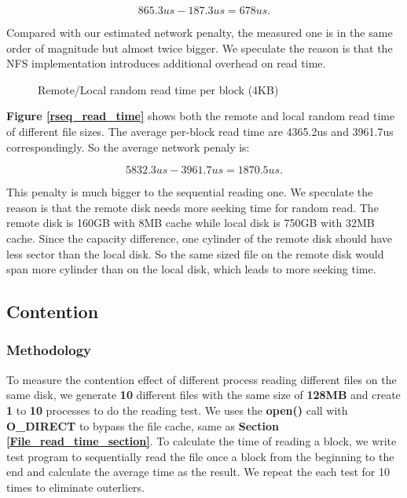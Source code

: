 $$865.3us - 187.3us = 678us.$$

Compared with our estimated network penalty, the measured one is in the same order of magnitude but almost twice bigger. We speculate the reason is that the NFS implementation introduces additional overhead on read time.

\begin{figure}[ht]
    \centering
    \caption{Remote/Local random read time per block (4KB)}
    \label{rrand_read_time}
\end{figure}

\textbf{Figure \ref{rseq_read_time}} shows both the remote and local random read time of different file sizes. The average per-block read time are 4365.2us and 3961.7us correspondingly. So the average network penaly is:

$$5832.3us - 3961.7us = 1870.5us.$$

This penalty is much bigger to the sequential reading one. We speculate the reason is that the remote disk needs more seeking time for random read. The remote disk is 160GB with 8MB cache while local disk is 750GB with 32MB cache. Since the capacity difference, one cylinder of the remote disk should have less sector than the local disk. So the same sized file on the remote disk would span more cylinder than on the local disk, which leads to more seeking time.

\subsection{Contention}
\subsubsection{Methodology}
To measure the contention effect of different process reading different files on the same disk, we generate \textbf{10} different files with the same size of \textbf{128MB} and create \textbf{1} to \textbf{10} processes to do the reading test. We uses the \textbf{open()} call with \textbf{O_DIRECT} to bypass the file cache, same as \textbf{Section \ref{File_read_time_section}}. To calculate the time of reading a block, we write test program to sequentially read the file once a block from the beginning to the end and calculate the average time as the result. We repeat the each test for 10 times to eliminate outerliers.

